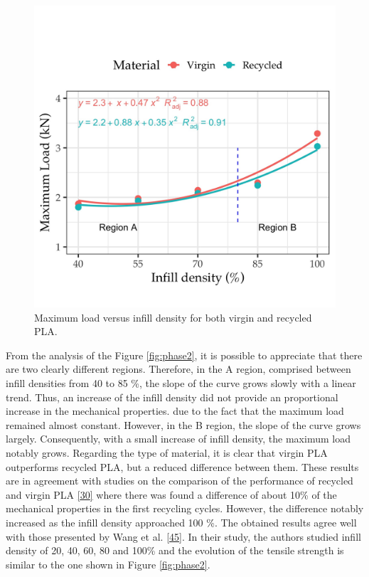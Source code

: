 \documentclass[conference,final,]{IEEEtran}
\begin{document}
\begin{figure}

{\centering \includegraphics[width=\linewidth]{Figures/Phase-2} 

}

\caption{Maximum load versus infill density for both virgin and recycled PLA. \label{fig:phase2}}\label{fig:Fig.Phase.2}
\end{figure}

From the analysis of the Figure \ref{fig:phase2}, it is possible to
appreciate that there are two clearly different regions. Therefore, in
the A region, comprised between infill densities from 40 to 85 \%, the
slope of the curve grows slowly with a linear trend. Thus, an increase
of the infill density did not provide an proportional increase in the
mechanical properties. due to the fact that the maximum load remained
almost constant. However, in the B region, the slope of the curve grows
largely. Consequently, with a small increase of infill density, the
maximum load notably grows. Regarding the type of material, it is clear
that virgin PLA outperforms recycled PLA, but a reduced difference
between them. These results are in agreement with studies on the
comparison of the performance of recycled and virgin PLA
\protect\hyperlink{ref-CruzSanchez2017}{{[}30{]}} where there was found
a difference of about 10\% of the mechanical properties in the first
recycling cycles. However, the difference notably increased as the
infill density approached 100 \%. The obtained results agree well with
those presented by Wang et al.
\protect\hyperlink{ref-Wang2020h}{{[}45{]}}. In their study, the authors
studied infill density of 20, 40, 60, 80 and 100\% and the evolution of
the tensile strength is similar to the one shown in Figure
\ref{fig:phase2}.
\end{document}

